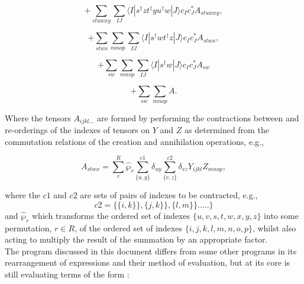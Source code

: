 \begin{equation*}
+\sum_{stuwxy} \sum_{IJ} \langle I | s^{\dagger}zt^{\dagger}yu^{\dagger}w | J \rangle c_{I} c^{*}_{J} A_{stuwxy},
\end{equation*}

\begin{equation*}
+\sum_{stwx}\sum_{mnop} \sum_{IJ} \langle I | s^{\dagger}wt^{\dagger}z | J \rangle c_{I} c^{*}_{J} A_{stwx},
\end{equation*}

\begin{equation*}
+\sum_{sw}\sum_{mnop} \sum_{IJ} \langle I | s^{\dagger}w | J \rangle c_{I} c^{*}_{J} A_{sw}
\end{equation*}

\begin{equation*}
+\sum_{sw}\sum_{mnop}  A .
\end{equation*}

\noindent Where the tensors $A_{ijkl...}$ are formed by performing the 
contractions between and re-orderings of the indexes of tensors on $Y$ and $Z$ as 
determined from the commutation relations of the creation and annihilation operations, e.g.,
 
\begin{equation*}
A_{stwx} = \sum_{r}^{R}\hat{\wp}_{r}\sum^{c1}_{\{u,y\}}\delta_{uy}\sum^{c2}_{\{v,z\}} \delta_{vz}Y_{ijkl}Z_{mnop},
\end{equation*}

\noindent where the $c1$ and $c2$ are sets of pairs of indexes to be contracted, e.g.,
\begin{equation}
c2 = \{ \{i, k\} \} , \{j, k\} \} ,\{l, m\} \}.....\} 
\end{equation}
and $\hat{\wp}_{r}$ which transforms the ordered set of indexes
$\{u,v,s,t,w,x,y,z\}$ into some permutation, $r\in R$, of the ordered set of
indexes $\{i,j,k,l,m,n,o,p\}$, whilst also acting to multiply the result of the
summation by an appropriate factor.\\

\noindent The program discussed in this document differs from some other programs in its rearrangement 
of expressions and their method of evaluation, but at its core is still evaluating terms of the form : 

